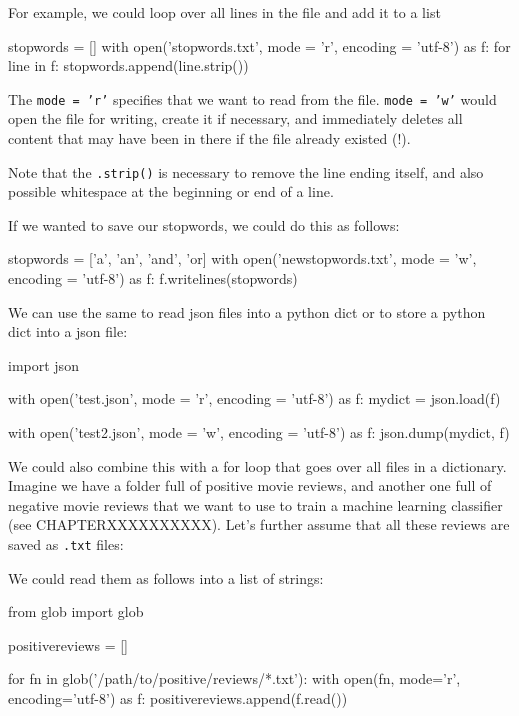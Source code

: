 For example, we could loop over all lines in the file and add it to a list

\begin{examplepy}
stopwords = []
with open('stopwords.txt', mode = 'r', encoding = 'utf-8') as f:
    for line in f:
        stopwords.append(line.strip())
\end{examplepy}

The \texttt{mode = 'r'} specifies that we want to read from the file. \texttt{mode = 'w'} would open the file for writing, create it if necessary, and immediately deletes all content that may have been in there if the file already existed (!).

Note that the \texttt{.strip()} is necessary to remove the line ending itself, and also possible whitespace at the beginning or end of a line.

If we wanted to save our stopwords, we could do this as follows: 
\begin{examplepy}
stopwords = ['a', 'an', 'and', 'or]
with open('newstopwords.txt', mode = 'w', encoding = 'utf-8') as f:
    f.writelines(stopwords)
\end{examplepy}

We can use the same to read json files into a python dict or to store a python dict into a json file:


\begin{examplepy}
import json

with open('test.json', mode = 'r', encoding = 'utf-8') as f:
    mydict = json.load(f)

with open('test2.json', mode = 'w', encoding = 'utf-8') as f:
    json.dump(mydict, f)

\end{examplepy}


We could also combine this with a for loop that goes over all files in a dictionary.
Imagine we have a folder full of positive movie reviews, and another one full of negative movie reviews that we want to use to train a machine learning classifier (see CHAPTERXXXXXXXXXX). Let's further assume that all these reviews are saved as \texttt{.txt} files:

We could read them as follows into a list of strings:

\begin{examplepy}
from glob import glob

positivereviews = []

for fn in glob('/path/to/positive/reviews/*.txt'):
    with open(fn, mode='r', encoding='utf-8') as f:
        positivereviews.append(f.read())
\end{examplepy}

